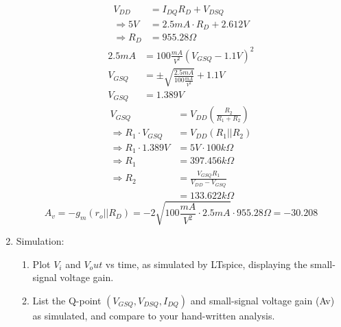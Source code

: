 \documentclass{article}
\begin{document}
\begin{enumerate}
\begin{center}
    \end{center}
    \begin{align}
        V_{DD} &=  I_{DQ}R_D + V_{DSQ}\\
        \Rightarrow 5V &=  2.5mA\cdot R_D + 2.612V\\
        \Rightarrow R_D &=  955.28\Omega
    \end{align}
    \begin{align}
        2.5mA &= 100\frac{mA}{V^2}(V_{GSQ}-1.1V)^2\\
         V_{GSQ} &= \pm\sqrt{\frac{2.5mA}{100\frac{mA}{V^2}}} + 1.1V\\
         V_{GSQ} &= 1.389V
    \end{align}
    \begin{align}
        V_{GSQ} &= V_{DD}\left(\frac{R_2}{R_1+R_2}\right)\\
        \Rightarrow R_1\cdot V_{GSQ} &= V_{DD}(R_1||R_2)\\
        \Rightarrow R_1\cdot1.389V &= 5V\cdot100k\Omega\\
        \Rightarrow R_1 &= \boxed{397.456k\Omega}\\
        \Rightarrow R_2 &= \frac{V_{GSQ}R_1}{V_{DD}-V_{GSQ}}\\
        &= \boxed{133.622k\Omega}
    \end{align}
    \begin{equation}
            A_v = -g_m(r_o||R_D) = -2\sqrt{100\frac{mA}{V^2}\cdot 2.5mA} \cdot 955.28\Omega = \boxed{-30.208}
    \end{equation}
\newpage
\item Simulation:
\begin{enumerate}
    \item Plot $V_i$ and $V_out$ vs time, as simulated by LTspice, displaying the small-signal voltage gain.
    \begin{center}
    \end{center}
    \item List the Q-point $(V_{GSQ}, V_{DSQ}, I_{DQ})$ and small-signal voltage gain (Av) as simulated, and compare to your hand-written analysis.

\end{enumerate}
\end{enumerate}
\end{document}
